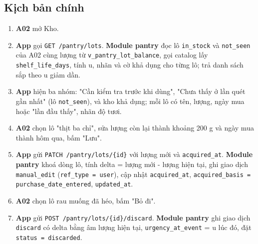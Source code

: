 \subsection{Kịch bản chính}
\begin{enumerate}
\item \textbf{A02} mở Kho.
\item \textbf{App} gọi {\small\texttt{GET /\allowbreak{}\allowbreak{}pantry/\allowbreak{}\allowbreak{}lots}}. \textbf{Module pantry} đọc lô {\small\texttt{in\_\allowbreak{}\allowbreak{}stock}} và {\small\texttt{not\_\allowbreak{}\allowbreak{}seen}} của A02 cùng lượng từ {\small\texttt{v\_\allowbreak{}\allowbreak{}pantry\_\allowbreak{}\allowbreak{}lot\_\allowbreak{}\allowbreak{}balance}}, gọi catalog lấy {\small\texttt{shelf\_\allowbreak{}\allowbreak{}life\_\allowbreak{}\allowbreak{}days}}, tính u, nhãn và cờ khả dụng cho từng lô; trả danh sách sắp theo u giảm dần.
\item \textbf{App} hiện ba nhóm: "Cần kiểm tra trước khi dùng", "Chưa thấy ở lần quét gần nhất" (lô {\small\texttt{not\_\allowbreak{}\allowbreak{}seen}}), và kho khả dụng; mỗi lô có tên, lượng, ngày mua hoặc "lần đầu thấy", nhãn độ tươi.
\item \textbf{A02} chọn lô "thịt ba chỉ", sửa lượng còn lại thành khoảng 200 g và ngày mua thành hôm qua, bấm "Lưu".
\item \textbf{App} gửi {\small\texttt{PATCH /\allowbreak{}\allowbreak{}pantry/\allowbreak{}\allowbreak{}lots/\allowbreak{}\allowbreak{}\{id\}}} với lượng mới và {\small\texttt{acquired\_\allowbreak{}\allowbreak{}at}}. \textbf{Module pantry} khoá dòng lô, tính delta = lượng mới - lượng hiện tại, ghi giao dịch {\small\texttt{manual\_\allowbreak{}\allowbreak{}edit}} ({\small\texttt{ref\_\allowbreak{}\allowbreak{}type = user}}), cập nhật {\small\texttt{acquired\_\allowbreak{}\allowbreak{}at}}, {\small\texttt{acquired\_\allowbreak{}\allowbreak{}basis = purchase\_\allowbreak{}\allowbreak{}date\_\allowbreak{}\allowbreak{}entered}}, {\small\texttt{updated\_\allowbreak{}\allowbreak{}at}}.
\item \textbf{A02} chọn lô rau muống đã héo, bấm "Bỏ đi".
\item \textbf{App} gửi {\small\texttt{POST /\allowbreak{}\allowbreak{}pantry/\allowbreak{}\allowbreak{}lots/\allowbreak{}\allowbreak{}\{id\}/\allowbreak{}\allowbreak{}discard}}. \textbf{Module pantry} ghi giao dịch {\small\texttt{discard}} có delta bằng âm lượng hiện tại, {\small\texttt{urgency\_\allowbreak{}\allowbreak{}at\_\allowbreak{}\allowbreak{}event}} = u lúc đó, đặt {\small\texttt{status = discarded}}.

\end{enumerate}
